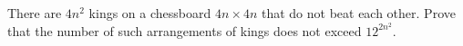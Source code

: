 \problem
There are $4 n^2$ kings on a chessboard $4 n \times 4 n$ that do not beat each
other.
Prove that the number of such arrangements of kings does not exceed
$12^{2n^2}$.

\solution

\endproblem
